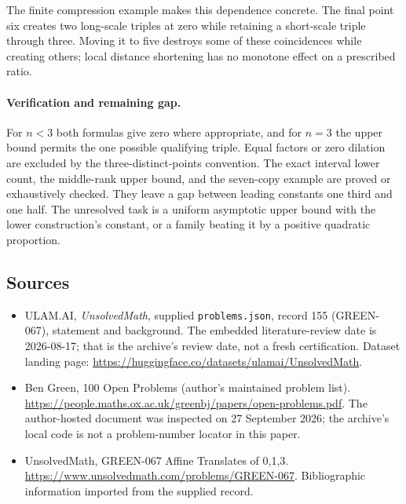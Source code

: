 \documentclass[11pt,a4paper]{article}
\begin{document}
The finite compression example makes this dependence concrete. The final point six creates two long-scale triples at zero while retaining a short-scale triple through three. Moving it to five destroys some of these coincidences while creating others; local distance shortening has no monotone effect on a prescribed ratio.

\paragraph{Verification and remaining gap.}
For $n<3$ both formulas give zero where appropriate, and for $n=3$ the upper bound permits the one possible qualifying triple. Equal factors or zero dilation are excluded by the three-distinct-points convention. The exact interval lower count, the middle-rank upper bound, and the seven-copy example are proved or exhaustively checked. They leave a gap between leading constants one third and one half. The unresolved task is a uniform asymptotic upper bound with the lower construction's constant, or a family beating it by a positive quadratic proportion.

\subsection{Sources}

{\small

\begin{itemize}

\item[\hypertarget{source:155:1}{S1}] ULAM.AI, \emph{UnsolvedMath}, supplied \texttt{problems.json}, record 155 (GREEN-067), statement and background. The embedded literature-review date is 2026-08-17; that is the archive’s review date, not a fresh certification. Dataset landing page: \url{https://huggingface.co/datasets/ulamai/UnsolvedMath}.

\item[\hypertarget{source:155:2}{S2}] Ben Green, 100 Open Problems (author’s maintained problem list). \url{https://people.maths.ox.ac.uk/greenbj/papers/open-problems.pdf}. The author-hosted document was inspected on 27 September 2026; the archive’s local code is not a problem-number locator in this paper.

\item[\hypertarget{source:155:3}{S3}] UnsolvedMath, GREEN-067 Affine Translates of {0,1,3}. \url{https://www.unsolvedmath.com/problems/GREEN-067}. Bibliographic information imported from the supplied record.

\end{itemize}

}

\label{end:155}
\end{document}
